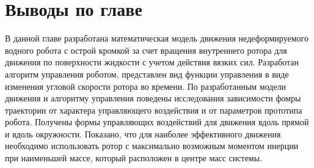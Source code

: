 

\section{Выводы по главе}

В данной главе разработана математическая модель движения недеформируемого водного робота с острой кромкой за счет вращения внутреннего ротора для движения по поверхности жидкости с учетом действия вязких сил. Разработан алгоритм управления роботом, представлен вид функции управления в виде изменения угловой скорости ротора во времени. По разработанным модели движения и алгоритму управления поведены исследования зависимости фомры траектории от характера управляющего воздействия и от параметров прототипа робота. Получены формы управляющих воздействий для движения вдоль прямой и вдоль окружности. Показано, что для наиболее эффективного движения необходимо использовать ротор с максимально возможным моментом инерции при наименьшей массе, который расположен в центре масс системы.


\clearpage